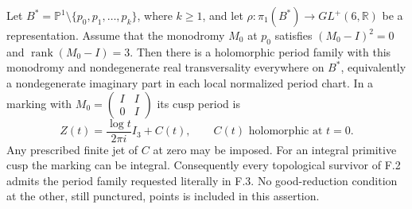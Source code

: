 \begin{theorem}\label{maps:src:F.3.11}


Let
$B^*=\mathbb P^1\setminus\{p_0,p_1,\ldots,p_k\}$,
where $k\ge1$, and let
$\rho:\pi_1(B^*)\to GL^+(6,\mathbb R)$ be a representation.
Assume that the monodromy $M_0$ at $p_0$ satisfies
$(M_0-I)^2=0$ and $\operatorname{rank}(M_0-I)=3$.
Then there is a holomorphic period family with this monodromy
and nondegenerate real transversality everywhere on $B^*$,
equivalently a nondegenerate imaginary part in each local
normalized period chart.
In a marking with $M_0=\left(\begin{smallmatrix}I&I\\0&I\end{smallmatrix}\right)$
its cusp period is
\[
 Z(t)=\frac{\log t}{2\pi i}I_3+C(t),
 \qquad C(t)\text{ holomorphic at }t=0.
 \tag{F.O6}\label{maps:eq:F.O6}
\]
Any prescribed finite jet of $C$ at zero may be imposed.
For an integral primitive cusp the marking can be integral.
Consequently every topological survivor of F.2 admits the
period family requested literally in F.3.  No good-reduction
condition at the other, still punctured, points is included
in this assertion.

\end{theorem}


